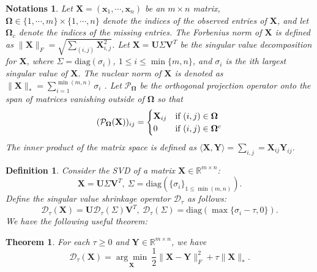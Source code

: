 \documentclass{article}
\newtheorem{definition}{Definition}[section]
\newtheorem{theorem}{Theorem}[section]
\newtheorem{notations}{Notations}
\begin{document}
{\begin{notations}
    Let $\mathbf X = (\mathbf x_1,\cdots,\mathbf x_n)$ be an $m \times n$ matrix, $\mathbf \Omega \in \{1,\cdots,m\}\times\{1,\cdots,n\}$ denote the indices of the observed
    entries of $\mathbf X$, and let $\mathbf \Omega_c$ denote the indices of the missing entries. The Forbenius norm of $\mathbf X$ is defined as $\lVert\mathbf X \rVert_F = \sqrt{\sum_{(i,j)} \mathbf X^2_{i,j}}$. Let $\mathbf X=\mathbf U\mathbf \varSigma \mathbf V^T$ be the singular value decomposition for $\mathbf X$, where $\varSigma = \text{diag}(\sigma_i)$, $1 \leq i\leq \min\{m,n\}$, and $\sigma_i$ is the ith largest singular value of $\mathbf X$. The nuclear norm of $\mathbf X$ is denoted as $\lVert\mathbf X \rVert_* = \sum_{i=1}^{\min(m,n)} \sigma_i$ . Let $\mathcal{P}_{\mathbf \Omega}$ be the orthogonal projection operator onto the span of matrices vanishing outside of $\mathbf \Omega$ so that
    \begin{equation*}
        (\mathcal{P}_{\mathbf \Omega}(\mathbf X))_{ij} = \begin{cases}
            \mathbf X_{ij} & \text{\rm if } (i,j) \in \mathbf \Omega\\
        0 & \text{\rm if } (i,j) \in \mathbf \Omega^c
    \end{cases}
    \end{equation*}
    The  inner product of the matrix space is defined as $ \langle \mathbf X,\mathbf Y\rangle = \sum_{i,j} = \mathbf X_{ij}\mathbf Y_{ij}$.
\end{notations}

\begin{definition}
    Consider the SVD of a matrix $\mathbf X \in \mathbb{R}^{m \times n}$:
    \begin{equation}
        \mathbf X = \mathbf U \mathbf \varSigma \mathbf V^T, \ \mathbf \varSigma = \text{diag}(\{\sigma_i\}_{1 \leq \min(m,n)}).
    \end{equation}
    Define the singular value shrinkage operator $\mathcal D_{\tau}$\cite{cai.shen200810} as follows:
    \begin{equation}
        \mathcal D_{\tau}(\mathbf X) = \mathbf U \mathcal D_{\tau}(\mathbf \varSigma) \mathbf V^T, \ \mathcal D_{\tau}(\mathbf \varSigma) = \text{diag}(\max\{\sigma_i-\tau,0\}).
    \end{equation}
    We have the following useful theorem:	
\end{definition}

\begin{theorem}
    For each $\tau \geq 0$ and $\mathbf Y \in \mathbb{R}^{m \times n}$, we have
    \begin{equation}
        \mathcal D_{\tau}(\mathbf X) = \underset{\mathbf X}{\arg\min}\  \frac{1}{2} \lVert \mathbf X-\mathbf Y\rVert_F^2 + \tau \lVert\mathbf X \lVert_*.
    \end{equation} 
    \label{thm32}
\end{theorem}

}
\end{document}

